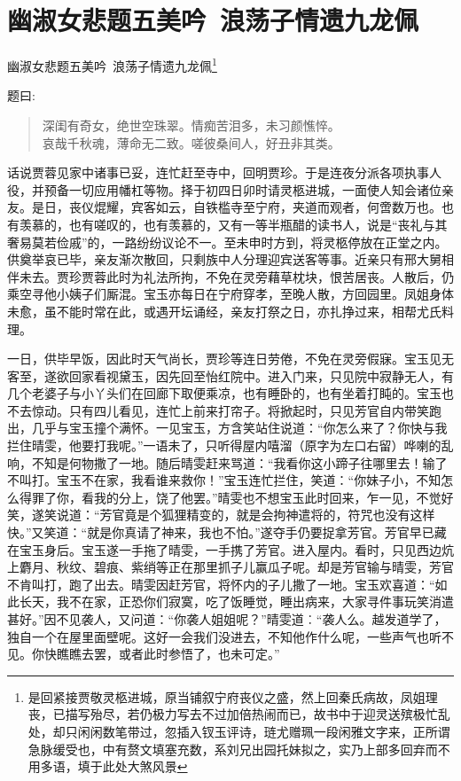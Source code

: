 \documentclass[12pt,oneside]{book}
\newenvironment{shici}{%
\begin{verse}%
\centering\large\hspace{12pt}}%
{\end{verse}}
\begin{document}
\chapter{幽淑女悲题五美吟~浪荡子情遗九龙佩}
幽淑女悲题五美吟~浪荡子情遗九龙佩\footnote{是回紧接贾敬灵柩进城，原当铺叙宁府丧仪之盛，然上回秦氏病故，凤姐理丧，已描写殆尽，若仍极力写去不过加倍热闹而已，故书中于迎灵送殡极忙乱处，却只闲闲数笔带过，忽插入钗玉评诗，琏尤赠珮一段闲雅文字来，正所谓急脉缓受也，中有赘文填塞充数，系刘兄出园托妹拟之，实乃上部多回弃而不用多语，填于此处大煞风景}

题曰:

\begin{shici}
深闺有奇女，绝世空珠翠。情痴苦泪多，未习颜憔悴。\\
哀哉千秋魂，薄命无二致。嗟彼桑间人，好丑非其类。
\end{shici}


话说贾蓉见家中诸事已妥，连忙赶至寺中，回明贾珍。于是连夜分派各项执事人役，并预备一切应用幡杠等物。择于初四日卯时请灵柩进城，一面使人知会诸位亲友。是日，丧仪焜耀，宾客如云，自铁槛寺至宁府，夹道而观者，何啻数万也。也有羡慕的，也有嗟叹的，也有羡慕的，又有一等半瓶醋的读书人，说是“丧礼与其奢易莫若俭戚”的，一路纷纷议论不一。至未申时方到，将灵柩停放在正堂之内。供奠举哀已毕，亲友渐次散回，只剩族中人分理迎宾送客等事。近亲只有邢大舅相伴未去。贾珍贾蓉此时为礼法所拘，不免在灵旁藉草枕块，恨苦居丧。人散后，仍乘空寻他小姨子们厮混。宝玉亦每日在宁府穿孝，至晚人散，方回园里。凤姐身体未愈，虽不能时常在此，或遇开坛诵经，亲友打祭之日，亦扎挣过来，相帮尤氏料理。

一日，供毕早饭，因此时天气尚长，贾珍等连日劳倦，不免在灵旁假寐。宝玉见无客至，遂欲回家看视黛玉，因先回至怡红院中。进入门来，只见院中寂静无人，有几个老婆子与小丫头们在回廊下取便乘凉，也有睡卧的，也有坐着打盹的。宝玉也不去惊动。只有四儿看见，连忙上前来打帘子。将掀起时，只见芳官自内带笑跑出，几乎与宝玉撞个满怀。一见宝玉，方含笑站住说道：“你怎么来了？你快与我拦住晴雯，他要打我呢。”一语未了，只听得屋内嘻溜（原字为左口右留）哗喇的乱响，不知是何物撒了一地。随后晴雯赶来骂道：“我看你这小蹄子往哪里去！输了不叫打。宝玉不在家，我看谁来救你！”宝玉连忙拦住，笑道：“你妹子小，不知怎么得罪了你，看我的分上，饶了他罢。”晴雯也不想宝玉此时回来，乍一见，不觉好笑，遂笑说道：“芳官竟是个狐狸精变的，就是会拘神遣将的，符咒也没有这样快。”又笑道：“就是你真请了神来，我也不怕。”遂夺手仍要捉拿芳官。芳官早已藏在宝玉身后。宝玉遂一手拖了晴雯，一手携了芳官。进入屋内。看时，只见西边炕上麝月、秋纹、碧痕、紫绡等正在那里抓子儿赢瓜子呢。却是芳官输与晴雯，芳官不肯叫打，跑了出去。晴雯因赶芳官，将怀内的子儿撒了一地。宝玉欢喜道：“如此长天，我不在家，正恐你们寂寞，吃了饭睡觉，睡出病来，大家寻件事玩笑消遣甚好。”因不见袭人，又问道：“你袭人姐姐呢？”晴雯道︰“袭人么。越发道学了，独自一个在屋里面壁呢。这好一会我们没进去，不知他作什么呢，一些声气也听不见。你快瞧瞧去罢，或者此时参悟了，也未可定。”
\end{document}

